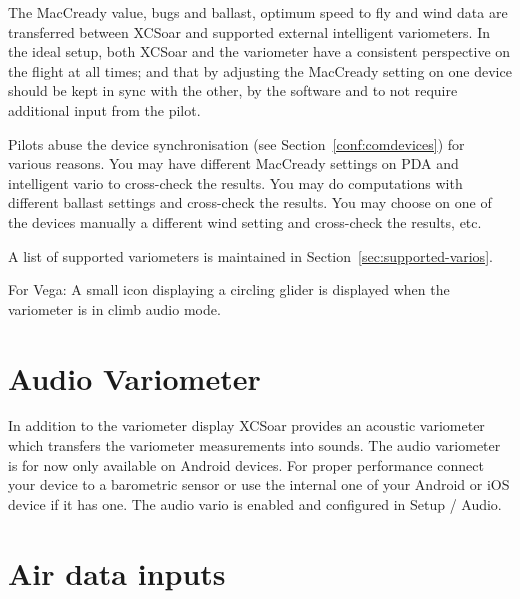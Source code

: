 The MacCready value, bugs and ballast, optimum speed to fly and wind
data are transferred between XCSoar and supported external intelligent
variometers.  In the ideal setup, both XCSoar and the variometer have
a consistent perspective on the flight at all times; and that by
adjusting the MacCready setting on one device should be kept in sync
with the other, by the software and to not require additional input from
the pilot.

Pilots abuse the device synchronisation (see Section~\ref{conf:comdevices}) for various
reasons. You may have  different MacCready settings on PDA and intelligent vario
to cross-check the results. You may do computations with different ballast 
settings and cross-check the results. You may choose on one of the devices
manually a different wind setting and cross-check the results, etc.

A list of supported variometers is maintained in
Section~\ref{sec:supported-varios}.

For Vega: A small icon displaying a circling glider is displayed when
the variometer is in climb audio mode.

\section{Audio Variometer}

In addition to the variometer display XCSoar provides an acoustic variometer which transfers the 
variometer measurements into sounds. The audio variometer is for now only available
on Android devices. For proper performance connect your device to a barometric sensor or use the
internal one of your Android or iOS device if it has one.
The audio vario is enabled and configured in Setup / Audio.


\section{Air data inputs}

